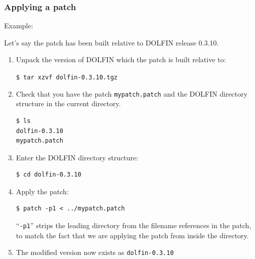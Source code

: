 \documentclass[12pt]{article}
\begin{document}
\subsubsection{Applying a patch}

Example:

Let's say the patch has been built relative to DOLFIN release 0.3.10.

\begin{enumerate}
\item{

Unpack the version of DOLFIN which the patch is built relative to:

\texttt{\$ tar xzvf dolfin-0.3.10.tgz}
}

\item{

Check that you have the patch \texttt{mypatch.patch} and the DOLFIN
directory structure in the current directory.

\begin{verbatim}
$ ls
dolfin-0.3.10
mypatch.patch
\end{verbatim}
}

\item{

Enter the DOLFIN directory structure:

\begin{verbatim}
$ cd dolfin-0.3.10
\end{verbatim}
}

\item{

Apply the patch:

\begin{verbatim}
$ patch -p1 < ../mypatch.patch
\end{verbatim}
}

``\texttt{-p1}'' strips the leading directory from the filename
references in the patch, to match the fact that we are applying the
patch from inside the directory.

\item{

The modified version now exists as \texttt{dolfin-0.3.10}

}

\end{enumerate}
\end{document}
